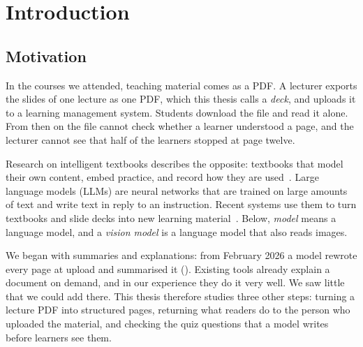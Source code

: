 \chapter{Introduction}
\label{ch:introduction}

\section{Motivation}
\label{sec:motivation}

In the courses we attended, teaching material comes as a PDF. A lecturer
exports the slides of one lecture as one PDF, which this thesis calls a
\emph{deck}, and uploads it to a learning management system. Students
download the file and read it alone. From then on the file cannot check
whether a learner understood a page, and the lecturer cannot see that half of
the learners stopped at page twelve.

Research on intelligent textbooks describes the opposite: textbooks that
model their own content, embed practice, and record how they are
used~\cite{brusilovsky2022return}. Large language models (LLMs) are neural
networks that are trained on large amounts of text and write text in reply to
an instruction. Recent systems use them to turn textbooks and slide decks into
new learning material~\cite{learnlm2025textbook,zhou2025slide2text}. Below,
\emph{model} means a language model, and a \emph{vision model} is a language
model that also reads images.

We began with summaries and explanations: from February 2026 a model rewrote
every page at upload and summarised it (). Existing tools
already explain a document on demand, and in our experience they do it very
well. We saw little that we could add there. This thesis therefore studies
three other steps: turning a lecture PDF into structured pages, returning what
readers do to the person who uploaded the material, and checking the quiz
questions that a model writes before learners see them.

